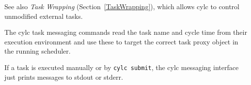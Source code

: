 
See also {\em Task Wrapping} (Section~\ref{TaskWrapping}), which allows
cylc to control unmodified external tasks.

\lstset{language=bash}

The cylc task messaging commands read the task name and cycle time from
their execution environment and use these to target the correct task
proxy object in the running scheduler.

If a task is executed manually or by \lstinline=cylc submit=, the cylc
messaging interface just prints messages to stdout or stderr.



%
